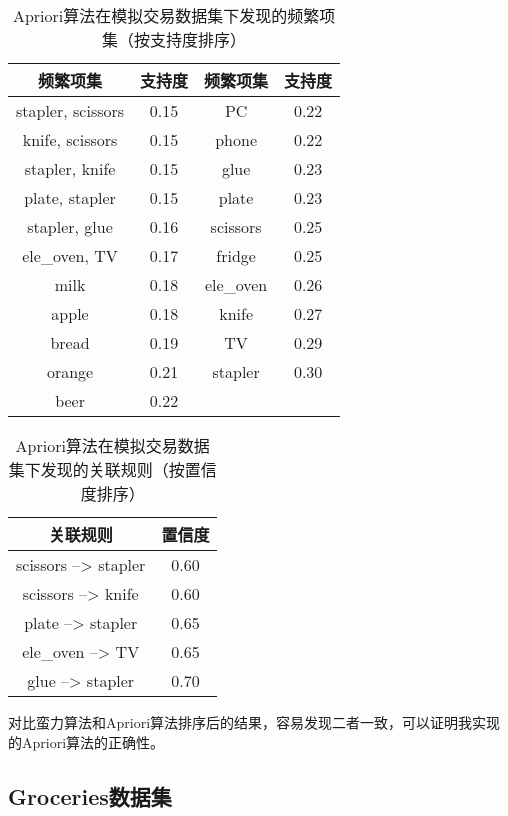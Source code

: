 \documentclass[12pt,a4paper]{article}
\theoremstyle{definition}
\begin{document}
\begin{table}[H]
	\renewcommand\arraystretch{1.35}
	\caption{Apriori算法在模拟交易数据集下发现的频繁项集（按支持度排序）}
	\label{tab:apriori_sim_sup}
	\centering
	
	\begin{tabular}{c|c|c|c}
		\centering
		频繁项集 & 支持度 & 频繁项集 & 支持度 \\
		\hline
		stapler, scissors & 0.15 & PC & 0.22 \\
		knife, scissors & 0.15 & phone & 0.22 \\
		stapler, knife & 0.15 & glue & 0.23 \\
		plate, stapler & 0.15 &plate & 0.23 \\
		stapler, glue & 0.16 & scissors & 0.25 \\
		ele\_oven, TV & 0.17 & fridge & 0.25 \\
		milk & 0.18 & ele\_oven & 0.26 \\
		apple & 0.18 & knife & 0.27 \\
		bread & 0.19 & TV & 0.29 \\
		orange & 0.21 & stapler & 0.30 \\
		beer & 0.22 & & \\		
	\end{tabular}
\end{table}

\begin{table}[H]
	\renewcommand\arraystretch{1.35}
	\caption{Apriori算法在模拟交易数据集下发现的关联规则（按置信度排序）}
	\label{tab:apriori_sim_con}
	\centering
	
	\begin{tabular}{c|c}
		\centering
		关联规则 & 置信度 \\
		\hline
		scissors --> stapler & 0.60 \\
		scissors --> knife & 0.60 \\
		plate --> stapler & 0.65 \\
		ele\_oven --> TV & 0.65 \\
		glue --> stapler & 0.70 \\
	\end{tabular}
\end{table}

对比蛮力算法和Apriori算法排序后的结果，容易发现二者一致，可以证明我实现的Apriori算法的正确性。

\subsection{Groceries数据集}
\end{document}
